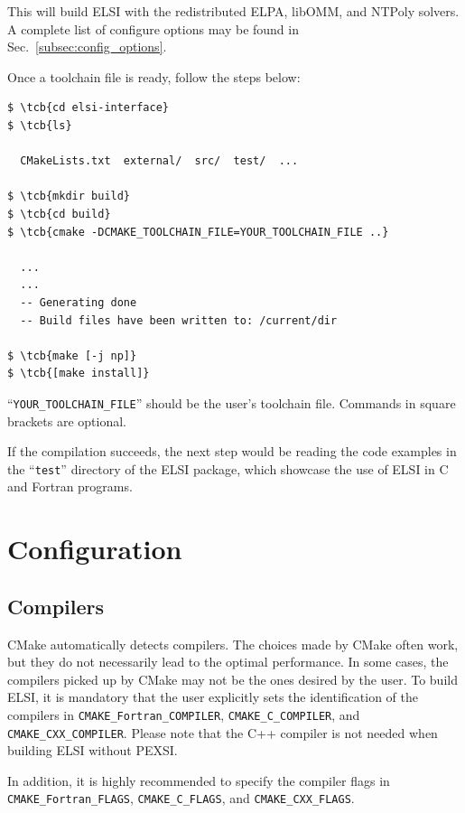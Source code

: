 \documentclass{report}
\newcommand{\tcb}[1]{\textcolor{blue}{#1}}
\begin{document}
This will build ELSI with the redistributed ELPA, libOMM, and NTPoly solvers. A complete list of configure options may be found in Sec.~\ref{subsec:config_options}.

Once a toolchain file is ready, follow the steps below:
\begin{tcolorbox}
\begin{Verbatim}[commandchars=\\\{\}]
$ \tcb{cd elsi-interface}
$ \tcb{ls}

  CMakeLists.txt  external/  src/  test/  ...

$ \tcb{mkdir build}
$ \tcb{cd build}
$ \tcb{cmake -DCMAKE_TOOLCHAIN_FILE=YOUR_TOOLCHAIN_FILE ..}

  ...
  ...
  -- Generating done
  -- Build files have been written to: /current/dir

$ \tcb{make [-j np]}
$ \tcb{[make install]}
\end{Verbatim}
\end{tcolorbox}

``\texttt{YOUR\_TOOLCHAIN\_FILE}'' should be the user's toolchain file. Commands in square brackets are optional.

If the compilation succeeds, the next step would be reading the code examples in the ``\texttt{test}'' directory of the ELSI package, which showcase the use of ELSI in C and Fortran programs.

\section{Configuration}
\label{sec:config}
\subsection{Compilers}
\label{subsec:config_compilers}
CMake automatically detects compilers. The choices made by CMake often work, but they do not necessarily lead to the optimal performance. In some cases, the compilers picked up by CMake may not be the ones desired by the user. To build ELSI, it is mandatory that the user explicitly sets the identification of the compilers in \texttt{CMAKE\_Fortran\_COMPILER}, \texttt{CMAKE\_C\_COMPILER}, and \texttt{CMAKE\_CXX\_COMPILER}. Please note that the C++ compiler is not needed when building ELSI without PEXSI.

In addition, it is highly recommended to specify the compiler flags in \texttt{CMAKE\_Fortran\_FLAGS}, \texttt{CMAKE\_C\_FLAGS}, and \texttt{CMAKE\_CXX\_FLAGS}.
\end{document}
